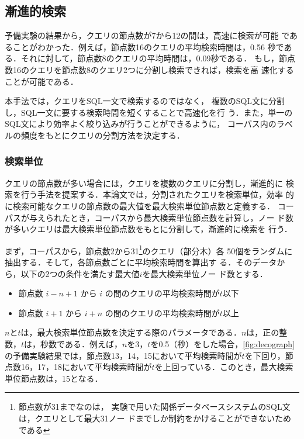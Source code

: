 \documentclass[japanese]{jnlp_1.3e}
\begin{document}
\subsection{漸進的検索}
\label{retrieve:separate}

予備実験の結果から，クエリの節点数が7から12の間は，高速に検索が可能
であることがわかった．例えば，節点数16のクエリの平均検索時間は，0.56
秒である．それに対して，節点数8のクエリの平均時間は，0.09秒である．
もし，節点数16のクエリを節点数8のクエリ2つに分割し検索できれば，検索を高
                      速化することが可能である．

本手法では，クエリをSQL一文で検索するのではなく，
複数のSQL文に分割し，SQL一文に要する検索時間を短くすることで高速化を行
う．また，単一のSQL文により効率よく絞り込みが行うことができるように，
コーパス内のラベルの頻度をもとにクエリの分割方法を決定する．


\subsubsection{検索単位}

クエリの節点数が多い場合には，クエリを複数のクエリに分割し，漸進的に
検索を行う手法を提案する．本論文では，分割されたクエリを検索単位，効率
的に検索可能なクエリの節点数の最大値を最大検索単位節点数と定義する．
コーパスが与えられたとき，コーパスから最大検索単位節点数を計算し，ノー
ド数が多いクエリは最大検索単位節点数をもとに分割して，漸進的に検索を
行う．

まず，コーパスから，節点数2から31\footnote{節点数が31までなのは，
実験で用いた関係データベースシステムのSQL文は，クエリとして最大31ノー
ドまでしか制約をかけることができないためである}のクエリ（部分木）各
50個をランダムに抽出する．そして，各節点数ごとに平均検索時間を算出す
る．そのデータから，以下の2つの条件を満たす最大値$i$を最大検索単位ノー
ド数とする．

\begin{itemize}
\item 節点数 $i - n +1$ から $i$ の間のクエリの平均検索時間が$t$以下
\item 節点数 $i + 1$ から $i + n$ の間のクエリの平均検索時間が$t$以上
\end{itemize}

$n$と$t$は，最大検索単位節点数を決定する際のパラメータである．$n$は，正の整数，$t$は，秒数である．例えば，$n$を3，$t$を0.5（秒）をした場合，\figurename\ref{fig:decograph}の予備実験結果では，節点数13，14，15において平均検索時間が$t$を下回り，節点数16，17，18において平均検索時間が$t$を上回っている．このとき，最大検索単位節点数は，15となる．
\end{document}
